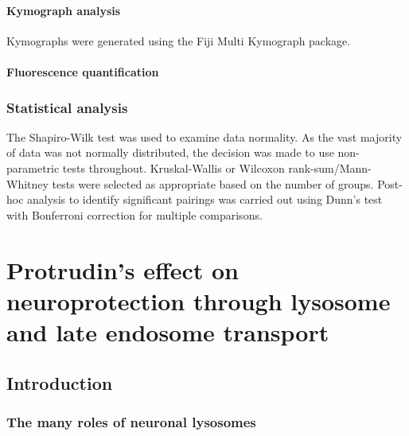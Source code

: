\documentclass[
  12pt,
  a4paper,
]{book}
\begin{document}
\hypertarget{kymograph-analysis}{%
\subsubsection{Kymograph analysis}\label{kymograph-analysis}}

Kymographs were generated using the Fiji Multi Kymograph package.

\hypertarget{fluorescence-quantification}{%
\subsubsection{Fluorescence quantification}\label{fluorescence-quantification}}

\hypertarget{statistical-analysis}{%
\subsection{Statistical analysis}\label{statistical-analysis}}

The Shapiro-Wilk test was used to examine data normality. As the vast majority of data was not normally distributed, the decision was made to use non-parametric tests throughout. Kruskal-Wallis or Wilcoxon rank-sum/Mann-Whitney tests were selected as appropriate based on the number of groups. Post-hoc analysis to identify significant pairings was carried out using Dunn's test with Bonferroni correction for multiple comparisons.

\hypertarget{protrudins-effect-on-neuroprotection-through-lysosome-and-late-endosome-transport}{%
\chapter{Protrudin's effect on neuroprotection through lysosome and late endosome transport}\label{protrudins-effect-on-neuroprotection-through-lysosome-and-late-endosome-transport}}


\hypertarget{introduction}{%
\section{Introduction}\label{introduction}}

\hypertarget{the-many-roles-of-neuronal-lysosomes}{%
\subsection{The many roles of neuronal lysosomes}\label{the-many-roles-of-neuronal-lysosomes}}
\end{document}
